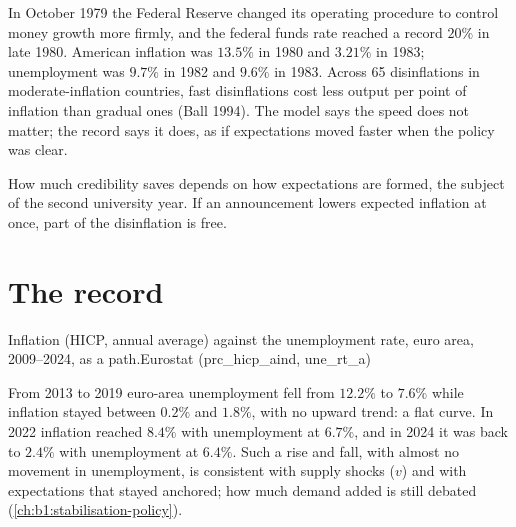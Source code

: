 \begin{record}
In October 1979 the Federal Reserve changed its operating procedure to
control money growth more firmly, and the federal funds rate reached a
record $20\%$ in late 1980. %
American inflation was $13.5\%$ in 1980 and $3.21\%$ in 1983; unemployment was
$9.7\%$ in 1982 and $9.6\%$ in 1983. %
Across 65 disinflations in moderate-inflation countries, fast disinflations
cost less output per point of inflation than gradual ones (Ball 1994).
The  model says the speed does not matter; the record says it
does, as if expectations moved faster when the policy was clear.
\end{record}

How much credibility saves depends on how expectations are formed, the
subject of the second university year. If an announcement lowers expected
inflation at once, part of the disinflation is free.

\section{The record}\label{sec:b1:aggregate-supply:record}

\begin{omchart}{Inflation (HICP, annual average) against the unemployment
rate, euro area, 2009--2024, as a path.}{Eurostat (prc\_hicp\_aind,
une\_rt\_a)}
\end{omchart}

From 2013 to 2019 euro-area unemployment fell from $12.2\%$ to $7.6\%$ while
inflation stayed between $0.2\%$ and $1.8\%$, with no upward trend: a flat
curve. In 2022 inflation
reached $8.4\%$ with unemployment at $6.7\%$, and in 2024 it was back to $2.4\%$
with unemployment at $6.4\%$. %
Such a rise and fall, with almost no movement in unemployment, is
consistent with supply shocks ($v$) and with expectations that stayed
anchored; how much demand added is still debated
(\cref{ch:b1:stabilisation-policy}).

